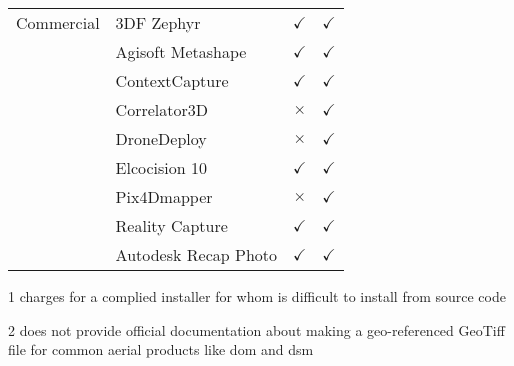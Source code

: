 \begin{table}[htb]
\begin{center}
{\begin{threeparttable}
\begin{tabular}{llcc}
        Commercial                         & 3DF Zephyr                                                                                                  & $\checkmark$         & $\checkmark$    \\
                                           & Agisoft Metashape                                                                                           & $\checkmark$         & $\checkmark$    \\
                                           & ContextCapture                                                                                              & $\checkmark$         & $\checkmark$    \\
                                           & Correlator3D                                                                                                & $\times$             & $\checkmark$    \\
                                           & DroneDeploy                                                                                                 & $\times$             & $\checkmark$    \\
                                           & Elcocision 10                                                                                               & $\checkmark$         & $\checkmark$    \\
                                           & Pix4Dmapper                                                                                                 & $\times$             & $\checkmark$    \\
                                           & Reality Capture                                                                                             & $\checkmark$         & $\checkmark$    \\
                                           & Autodesk Recap Photo                                                                                        & $\checkmark$         & $\checkmark$    \\ \hline
      \end{tabular}
      \begin{tablenotes}
        \footnotesize
        \item[1] charges for a complied installer for whom is difficult to install from source code
        \item[2] does not provide official documentation about making a geo-referenced GeoTiff file for common aerial products like \gls{dom} and \gls{dsm}
      \end{tablenotes}
      \end{threeparttable}
    }
    \end{center}
\end{table}